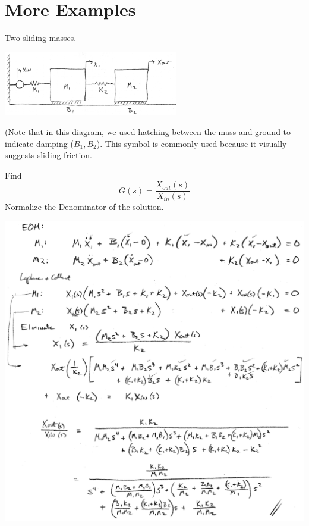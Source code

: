 \section{More Examples}

\begin{Example}\label{3MassExample}
Two sliding masses.


\includegraphics[width=3.0in]{figs02/00727a.png}

(Note that in this diagram, we used hatching between the mass and ground to indicate damping ($B_1, B_2$).  This symbol is commonly used because it visually suggests sliding friction.

Find
\[
G(s) = \frac{X_{out}(s)}{X_{in}(s)}
\]
Normalize the Denominator of the solution.

\includegraphics[width=5.5in]{figs02/00729a.png}

\end{Example}



